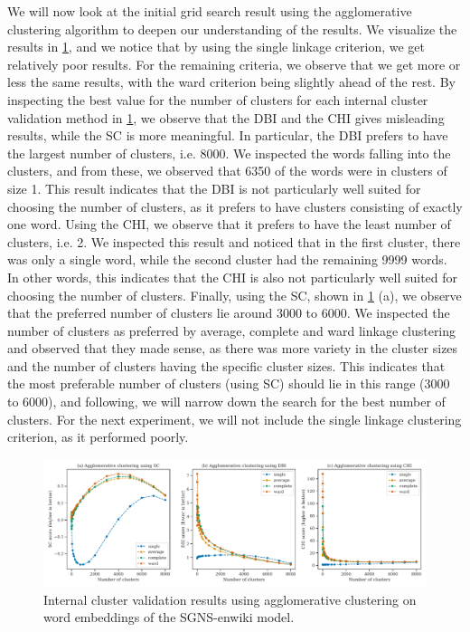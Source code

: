 We will now look at the initial grid search result using the agglomerative clustering algorithm to deepen our understanding of the results. We visualize the results in \cref{fig:cluster-analysis-agglomerative-internal-cluster-validation}, and we notice that by using the single linkage criterion, we get relatively poor results. For the remaining criteria, we observe that we get more or less the same results, with the ward criterion being slightly ahead of the rest. By inspecting the best value for the number of clusters for each internal cluster validation method in \cref{fig:cluster-analysis-agglomerative-internal-cluster-validation}, we observe that the DBI and the CHI gives misleading results, while the SC is more meaningful. In particular, the DBI prefers to have the largest number of clusters, i.e. 8000. We inspected the words falling into the clusters, and from these, we observed that 6350 of the words were in clusters of size 1. This result indicates that the DBI is not particularly well suited for choosing the number of clusters, as it prefers to have clusters consisting of exactly one word. Using the CHI, we observe that it prefers to have the least number of clusters, i.e. 2. We inspected this result and noticed that in the first cluster, there was only a single word, while the second cluster had the remaining 9999 words. In other words, this indicates that the CHI is also not particularly well suited for choosing the number of clusters. Finally, using the SC, shown in \cref{fig:cluster-analysis-agglomerative-internal-cluster-validation} (a), we observe that the preferred number of clusters lie around 3000 to 6000. We inspected the number of clusters as preferred by average, complete and ward linkage clustering and observed that they made sense, as there was more variety in the cluster sizes and the number of clusters having the specific cluster sizes. This indicates that the most preferable number of clusters (using SC) should lie in this range (3000 to 6000), and following, we will narrow down the search for the best number of clusters. For the next experiment, we will not include the single linkage clustering criterion, as it performed poorly.
\begin{figure}[H]
    \centering
    \includegraphics[width=\textwidth]{thesis/figures/cluster-analysis-agglomerative-internal-cluster-validation.pdf}
    \caption{Internal cluster validation results using agglomerative clustering on word embeddings of the SGNS-enwiki model.}
    \label{fig:cluster-analysis-agglomerative-internal-cluster-validation}
\end{figure}

